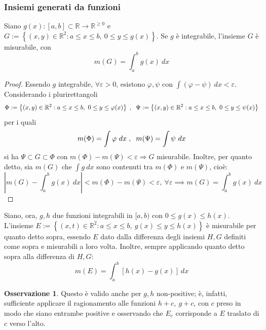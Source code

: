 \documentclass[11pt, a4paper]{scrartcl}
\theoremstyle{definition}
\numberwithin{esempio}{section}
\theoremstyle{definition}
\newtheorem{obs}{Osservazione}
\numberwithin{obs}{section}
\numberwithin{nota}{section}
\numberwithin{equation}{subsection}
\begin{document}
\subsubsection{Insiemi generati da funzioni}
Siano $g(x):\left[ a,b \right] \subset \mathbb{R} \to \mathbb{R}^{\ge 0}  $  e $G:= \left\{ (x,y) \in \mathbb{R}^2 : a\le x\le b , \ 0 \le  y \le  g(x) \right\}$. Se $g$ \`e integrabile, l'insieme $G$ \`e misurabile, con 
\begin{equation}
	m(G) = \int_{a} ^b g(x) \ dx
\end{equation}
\begin{proof}
	Essendo $g$ integrabile, $\forall \varepsilon >0$, esistono $\varphi ,\psi $ con $\int (\varphi -\psi ) \ dx < \varepsilon  $. Considerando i plurirettangoli 
	\[
		\Phi := \left\{ (x,y) \in \mathbb{R}^2 : a\le x\le b , \ 0\le  y \le \varphi (x) \right\} \hspace{.1cm} , \hspace{.2cm} \Psi := \left\{ (x,y) \in \mathbb{R}^2 : a\le x\le b , \ 0\le  y \le \psi (x) \right\}
	\] 
	per i quali
	\[
		m(\Phi) = \int \varphi  \ dx \hspace{.1cm} , \hspace{.2cm} m(\Psi) = \int \psi  \ dx 
	\] 
	si ha $\Psi \subset G \subset \Phi$ con $m(\Phi) - m(\Psi) < \varepsilon \Rightarrow G$ misurabile. 
	Inoltre, per quanto detto, sia $m(G)$ che $\int g \ dx$ sono contenuti tra $m(\Phi)$ e $m(\Psi)$, cio\`e:
	\[
	\left\lvert m(G) - \int_{a} ^b g(x) \ dx \right\rvert < m(\Phi) - m(\Psi)  < \varepsilon , \ \forall \varepsilon \implies m(G) = \int_{a} ^b g(x) \ dx
	\] 
	
\end{proof}
Siano, ora, $g,h$ due funzioni integrabili in $[a,b)$ con $0\le g(x) \le  h(x)$. L'insieme $E:=\left\{ (x,t) \in \mathbb{R}^2 : a\le x\le b, \ g(x) \le y \le h(x) \right\} $ \`e misurabile per quanto detto sopra, essendo $E$ dato dalla differenza degli insiemi $H,G$ definiti come sopra e misurabili a loro volta. Inoltre, sempre applicando quanto detto sopra alla differenza di $H,G$:
\[
m(E) = \int_{a} ^b \left[ h(x) - g(x) \right] \ dx 
\] 
\begin{obs}
	Questo \`e valido anche per $g,h$ non-positive; \`e, infatti, sufficiente applicare il ragionamento alle funzioni $h+c, \ g+c$, con $c$ preso in modo che siano entrambe positive e osservando che $E_c$ corrisponde a $E$ traslato di $c$ verso l'alto.
\end{obs}
\end{document}
